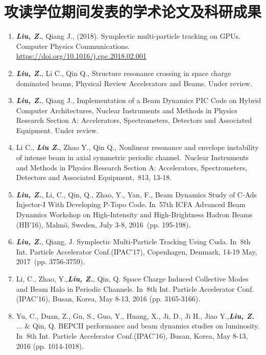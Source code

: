 \chapter{攻读学位期间发表的学术论文及科研成果}
\begin{enumerate}
  \item \textbf{\textit{Liu, Z.}}, Qiang J., (2018). Symplectic multi-particle tracking on GPUs. Computer Physics Communications. \href{https://doi.org/10.1016/j.cpc.2018.02.001}{https://doi.org/10.1016/j.cpc.2018.02.001}
  \item \textbf{\textit{Liu, Z.}}, Li C., Qin Q., Structure resonance crossing in space charge dominated beams, Physical Review Accelerators and Beams. \color{red}Under review\color{black}.
  \item \textbf{\textit{Liu, Z.}}, Qiang J., Implementation of a Beam Dynamics PIC Code on Hybrid Computer Architectures, Nuclear Instruments and Methods in Physics Research Section A: Accelerators, Spectrometers, Detectors and Associated Equipment. \color{red}Under review\color{black}.
  \item Li C., \textbf{\textit{Liu Z.}}, Zhao Y., Qin Q., Nonlinear resonance and envelope instability of intense beam in axial symmetric periodic channel. Nuclear Instruments and Methods in Physics Research Section A: Accelerators, Spectrometers, Detectors and Associated Equipment, 813, 13-18.
  \item \textbf{\textit{Liu, Z.}}, Li, C., Qin, Q., Zhao, Y., Yan, F., Beam Dynamics Study of C-Ads Injector-I With Developing P-Topo Code. In 57th ICFA Advanced Beam Dynamics Workshop on High-Intensity and High-Brightness Hadron Beams (HB'16), Malmö, Sweden, July 3-8, 2016 (pp. 195-198).
  \item \textbf{\textit{Liu, Z.}}, Qiang, J. Symplectic Multi-Particle Tracking Using Cuda. In 8th Int. Particle Accelerator Conf.(IPAC'17), Copenhagen, Denmark, 14-19 May, 2017 (pp. 3756-3759).
  \item Li, C., Zhao, Y.,\textbf{\textit{Liu, Z.}},  Qin, Q. Space Charge Induced Collective Modes and Beam Halo in Periodic Channels. In 8th Int. Particle Accelerator Conf.(IPAC'16), Busan, Korea, May 8-13, 2016 (pp. 3165-3166).
  \item Yu, C., Duan, Z., Gu, S., Guo, Y., Huang, X., Ji, D., Ji H., Jiao Y.,\textbf{\textit{Liu, Z.}} ... \& Qin, Q. BEPCII performance and beam dynamics studies on luminosity. In 8th Int. Particle Accelerator Conf.(IPAC'16), Busan, Korea, May 8-13, 2016 (pp. 1014-1018).
\end{enumerate}



